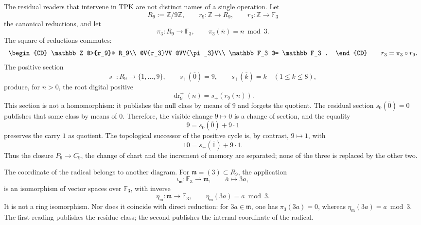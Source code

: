 The residual readers that intervene in TPK are not distinct names of
a single operation. Let
\[
 R_9:=\mathbb Z/9\mathbb Z,
 \qquad
 r_9:\mathbb Z\longrightarrow R_9,
 \qquad
 r_3:\mathbb Z\longrightarrow\mathbb F_3
\]
the canonical reductions, and let
\[
 \pi_3:R_9\longrightarrow\mathbb F_3,
 \qquad \pi_3(\overline n)=n\bmod3.
\]
The square of reductions commutes:
\begin{equation}
\begin{CD}
 \mathbb Z @>{r_9}>> R_9\\
 @V{r_3}VV @VV{\pi_3}V\\
 \mathbb F_3 @= \mathbb F_3 .
\end{CD}
\qquad
 r_3=\pi_3\circ r_9.
\label{eq:diagrama-reducciones-9-3-rev3}
\end{equation}
The positive section
\[
 s_+:R_9\longrightarrow\{1,\ldots,9\},
 \qquad
 s_+(\overline0)=9,
 \qquad
 s_+(\overline k)=k\quad(1\le k\le8),
\]
produce, for \(n>0\), the root digital positive
\[
 \operatorname{dr}_9^+(n)=s_+(r_9(n)).
\]
This section is not a homomorphism: it publishes the null class by means of \(9\) and
forgets the quotient. The residual section \(s_0(\overline0)=0\) publishes that
same class by means of \(0\). Therefore, the visible change \(9\mapsto0\) is a
change of section, and the equality
\[
 9=s_0(\overline0)+9\cdot1
\]
preserves the carry \(1\) as quotient. The topological successor of the
positive cycle is, by contrast, \(9\mapsto1\), with
\[
 10=s_+(\overline1)+9\cdot1.
\]
Thus the closure \(P_9\to C_9\), the change of chart and the increment
of memory are separated; none of the three is replaced by the other two.

The coordinate of the radical belongs to another diagram. For
\(\mathfrak m=(3)\subset R_9\), the application
\[
 \iota_{\mathfrak m}:\mathbb F_3\longrightarrow\mathfrak m,
 \qquad \overline a\longmapsto3a,
\]
is an isomorphism of vector spaces over \(\mathbb F_3\), with inverse
\begin{equation}
 \eta_{\mathfrak m}:\mathfrak m\longrightarrow\mathbb F_3,
 \qquad
 \eta_{\mathfrak m}(3a)=a\bmod3.
 \label{eq:coordenada-radical-compatibilidad-rev3}
\end{equation}
It is not a ring isomorphism. Nor does it coincide with direct reduction:
for \(3a\in\mathfrak m\), one has \(\pi_3(3a)=0\), whereas \(\eta_{\mathfrak m}(3a)=a\bmod3\). The first
reading publishes the residue class; the second publishes the internal
coordinate of the radical.

